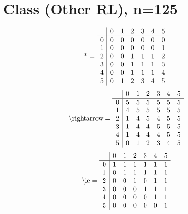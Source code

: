 \documentclass[11pt]{article}
\begin{document}
\section{Class (Other RL), n=125}
\[\text{*} = 
\begin{array}{r | r r r r r r}
 & 0 & 1 & 2 & 3 & 4 & 5 \\ \hline
0 & 0 & 0 & 0 & 0 & 0 & 0 \\
1 & 0 & 0 & 0 & 0 & 0 & 1 \\
2 & 0 & 0 & 1 & 1 & 1 & 2 \\
3 & 0 & 0 & 1 & 1 & 1 & 3 \\
4 & 0 & 0 & 1 & 1 & 1 & 4 \\
5 & 0 & 1 & 2 & 3 & 4 & 5 \\
\end{array}
\]
\[\text{\textbackslash rightarrow} = 
\begin{array}{r | r r r r r r}
 & 0 & 1 & 2 & 3 & 4 & 5 \\ \hline
0 & 5 & 5 & 5 & 5 & 5 & 5 \\
1 & 4 & 5 & 5 & 5 & 5 & 5 \\
2 & 1 & 4 & 5 & 4 & 5 & 5 \\
3 & 1 & 4 & 4 & 5 & 5 & 5 \\
4 & 1 & 4 & 4 & 4 & 5 & 5 \\
5 & 0 & 1 & 2 & 3 & 4 & 5 \\
\end{array}
\]
\[\text{\textbackslash le} = 
\begin{array}{r | r r r r r r}
 & 0 & 1 & 2 & 3 & 4 & 5 \\ \hline
0 & 1 & 1 & 1 & 1 & 1 & 1 \\
1 & 0 & 1 & 1 & 1 & 1 & 1 \\
2 & 0 & 0 & 1 & 0 & 1 & 1 \\
3 & 0 & 0 & 0 & 1 & 1 & 1 \\
4 & 0 & 0 & 0 & 0 & 1 & 1 \\
5 & 0 & 0 & 0 & 0 & 0 & 1 \\
\end{array}
\]
\end{document}
